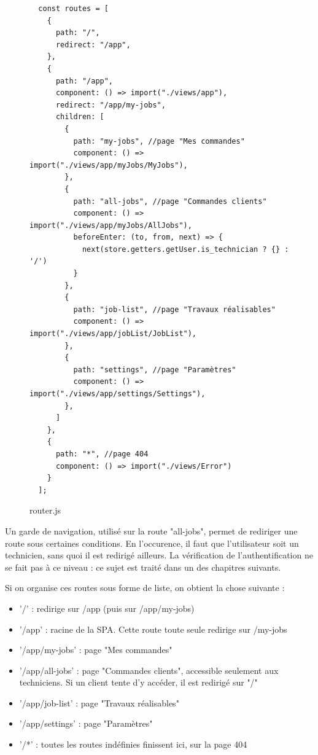 \documentclass[
    iai, %
    eai, %
]{heig-tb}
\begin{document}
\begin{figure}[h]
  \begin{verbatim}
  const routes = [
    {
      path: "/",
      redirect: "/app",
    },
    {
      path: "/app",
      component: () => import("./views/app"),
      redirect: "/app/my-jobs",
      children: [
        {
          path: "my-jobs", //page "Mes commandes"
          component: () => import("./views/app/myJobs/MyJobs"),
        },
        {
          path: "all-jobs", //page "Commandes clients"
          component: () => import("./views/app/myJobs/AllJobs"),
          beforeEnter: (to, from, next) => {
            next(store.getters.getUser.is_technician ? {} : '/')
          }
        },
        {
          path: "job-list", //page "Travaux réalisables"
          component: () => import("./views/app/jobList/JobList"),
        },
        {
          path: "settings", //page "Paramètres"
          component: () => import("./views/app/settings/Settings"),
        },
      ]
    },
    {
      path: "*", //page 404
      component: () => import("./views/Error")
    }
  ];
  \end{verbatim}
  \caption{router.js}
\end{figure}

Un garde de navigation, utilisé sur la route "all-jobs", permet de rediriger une route sous certaines conditions. En l'occurence, il faut que l'utilisateur soit un technicien, sans quoi il est redirigé ailleurs. La vérification de l'authentification ne se fait pas à ce niveau : ce sujet est traité dans un des chapitres suivants.

\newpage
Si on organise ces routes sous forme de liste, on obtient la chose suivante :
\begin{itemize}
  \item '/' : redirige sur /app (puis sur /app/my-jobs)
  \item '/app' : racine de la SPA. Cette route toute seule redirige sur /my-jobs
  \item '/app/my-jobs' : page "Mes commandes"
  \item '/app/all-jobs' : page "Commandes clients", accessible seulement aux techniciens. Si un client tente d'y accéder, il est redirigé sur "/"
  \item '/app/job-list' : page "Travaux réalisables"
  \item '/app/settings' : page "Paramètres"
  \item '/*' : toutes les routes indéfinies finissent ici, sur la page 404
\end{itemize}
\bigskip
\end{document}
